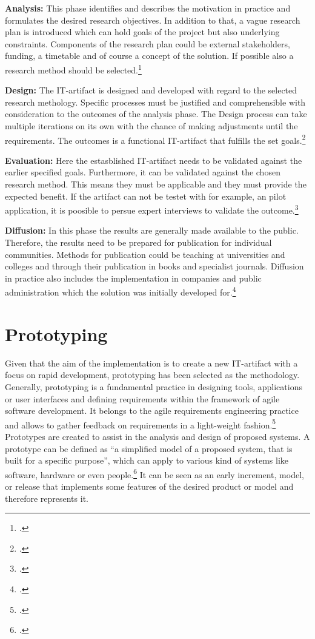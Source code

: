 \textbf{Analysis:} This phase identifies and describes the motivation in practice and formulates the desired research objectives.
In addition to that, a vague research plan is introduced which can hold goals of the project but also underlying constraints. 
Components of the research plan could be external stakeholders, funding, a timetable and of course a concept of the solution.
If possible also a research method should be selected.\footcite[cf.][4]{oesterleMemorandumZurGestaltungsorientierten2010}

\textbf{Design:} The \ac{IT}-artifact is designed and developed with regard to the selected research methology. 
Specific processes must be justified and comprehensible with consideration to the outcomes of the analysis phase.
The Design process can take multiple iterations on its own with the chance of making adjustments until the requirements.
The outcomes is a functional \ac{IT}-artifact that fulfills the set goals.\footcite[cf.][279]{oesterleKonsortialforschung2010}

\textbf{Evaluation:} Here the estasblished \ac{IT}-artifact needs to be validated against the earlier specified goals. 
Furthermore, it can be validated against the chosen research method. 
This means they must be applicable and they must provide the expected benefit.
If the artifact can not be testet with for example, an pilot application, it is poosible to persue expert interviews to validate the outcome.\footcite[cf.][279]{oesterleKonsortialforschung2010}

\textbf{Diffusion:} In this phase the results are generally made available to the public.
Therefore, the results need to be prepared for publication for individual communities.
Methods for publication could be teaching at universities and colleges and through their publication in books and specialist journals.
Diffusion in practice also includes the implementation in companies and public administration which the solution was initially developed for.\footcite[cf.][5]{oesterleMemorandumZurGestaltungsorientierten2010}

\section{Prototyping}

Given that the aim of the implementation is to create a new \ac{IT}-artifact with a focus on rapid development, prototyping has been selected as the methodology.
Generally, prototyping is a fundamental practice in designing tools, applications or user interfaces and defining requirements within the framework of agile software development.
It belongs to the agile requirements engineering practice and allows to gather feedback on requirements in a light-weight fashion.\footcite[cf.][1]{bjarnasonModelSoftwarePrototyping2021a}
Prototypes are created to assist in the analysis and design of proposed systems.
A prototype can be defined as ``a simplified model of a proposed system, that is built for a specific purpose'', which can apply to various kind of systems like software, hardware or even people.\footcite[][470]{luqiRapidSoftwarePrototyping1992}
It can be seen as an early increment, model, or release that implements some features of the desired product or model and therefore represents it. 

